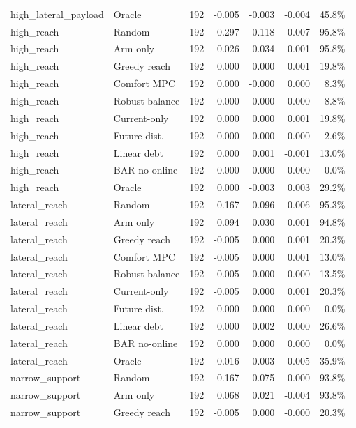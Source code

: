 \begin{longtable}{llrrrrr}
high\_lateral\_payload & Oracle & 192 & -0.005 & -0.003 & -0.004 & 45.8\% \\
high\_reach & Random & 192 & 0.297 & 0.118 & 0.007 & 95.8\% \\
high\_reach & Arm only & 192 & 0.026 & 0.034 & 0.001 & 95.8\% \\
high\_reach & Greedy reach & 192 & 0.000 & 0.000 & 0.001 & 19.8\% \\
high\_reach & Comfort MPC & 192 & 0.000 & -0.000 & 0.000 & 8.3\% \\
high\_reach & Robust balance & 192 & 0.000 & -0.000 & 0.000 & 8.8\% \\
high\_reach & Current-only & 192 & 0.000 & 0.000 & 0.001 & 19.8\% \\
high\_reach & Future dist. & 192 & 0.000 & -0.000 & -0.000 & 2.6\% \\
high\_reach & Linear debt & 192 & 0.000 & 0.001 & -0.001 & 13.0\% \\
high\_reach & BAR no-online & 192 & 0.000 & 0.000 & 0.000 & 0.0\% \\
high\_reach & Oracle & 192 & 0.000 & -0.003 & 0.003 & 29.2\% \\
lateral\_reach & Random & 192 & 0.167 & 0.096 & 0.006 & 95.3\% \\
lateral\_reach & Arm only & 192 & 0.094 & 0.030 & 0.001 & 94.8\% \\
lateral\_reach & Greedy reach & 192 & -0.005 & 0.000 & 0.001 & 20.3\% \\
lateral\_reach & Comfort MPC & 192 & -0.005 & 0.000 & 0.001 & 13.0\% \\
lateral\_reach & Robust balance & 192 & -0.005 & 0.000 & 0.000 & 13.5\% \\
lateral\_reach & Current-only & 192 & -0.005 & 0.000 & 0.001 & 20.3\% \\
lateral\_reach & Future dist. & 192 & 0.000 & 0.000 & 0.000 & 0.0\% \\
lateral\_reach & Linear debt & 192 & 0.000 & 0.002 & 0.000 & 26.6\% \\
lateral\_reach & BAR no-online & 192 & 0.000 & 0.000 & 0.000 & 0.0\% \\
lateral\_reach & Oracle & 192 & -0.016 & -0.003 & 0.005 & 35.9\% \\
narrow\_support & Random & 192 & 0.167 & 0.075 & -0.000 & 93.8\% \\
narrow\_support & Arm only & 192 & 0.068 & 0.021 & -0.004 & 93.8\% \\
narrow\_support & Greedy reach & 192 & -0.005 & 0.000 & -0.000 & 20.3\% \\

\end{longtable}
